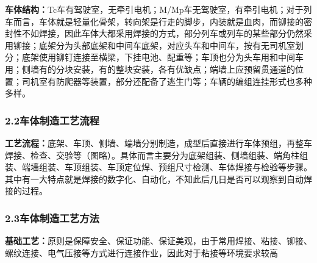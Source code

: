 \documentclass[12pt, oneside, a4paper]{ctexart}
\begin{document}
{\bf{}车体结构：}Tc车有驾驶室，无牵引电机；M/Mp车无驾驶室，有牵引电机；对于列车而言，车体就是轻量化骨架，转向架是行走的脚步，内装就是血肉，而铆接的密封性不如焊接，因此车体大都采用焊接的方式，部分列车或列车的某些部分仍然采用铆接；底架分为头部底架和中间车底架，对应头车和中间车，按有无司机室划分；底架使用铆钉连接至横梁，下挂电池、配重等；车顶也分为头车用和中间车用；侧墙有的分块安装，有的整块安装，各有优缺点；端墙上应预留贯通道的位置；司机室有防爬器等装置，部分还配备了逃生门等；车辆的编组连挂形式也多种多样。
\vspace{-5mm}\subsubsection*{2.2\quad{}车体制造工艺流程}\vspace{-2mm}
{\bf{}工艺流程：}底架、车顶、侧墙、端墙分别制造，成型后直接进行车体预组，再整车焊接、检查、交验等（图略）。具体而言主要分为底架组装、侧墙组装、端角柱组装、端墙组装、车顶组装、车顶定位焊、预组尺寸检测、车体焊接与检验等步骤。其中有一大特点就是焊接的数字化、自动化，不知此后几日是否可以观察到自动焊接的过程。\par{}
\vspace{-5mm}\subsubsection*{2.3\quad{}车体制造工艺方法}\vspace{-2mm}
{\bf{}基础工艺：}原则是保障安全、保证功能、保证美观，由于常用焊接、粘接、铆接、螺纹连接、电气压接等方式进行连接作业，因此对于粘接等环境要求较高\par{}
\end{document}
